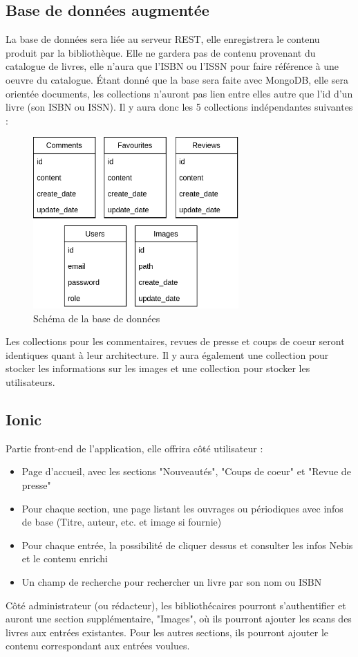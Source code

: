 \documentclass[a4paper, 12pt]{article}
\begin{document}
\subsection{Base de données augmentée}
La base de données sera liée au serveur REST, elle enregistrera le contenu produit par la bibliothèque. Elle ne gardera pas 
de contenu provenant du catalogue de livres, elle n'aura que l'ISBN ou l'ISSN pour faire référence à une oeuvre du catalogue. 
Étant donné que la base sera faite avec MongoDB, elle sera orientée documents, les collections n'auront pas lien entre elles 
autre que l'id d'un livre (son ISBN ou ISSN). Il y aura donc les 5 collections indépendantes suivantes :
\begin{figure}
    \begin{center}
        \includegraphics[width=0.7\textwidth]{images/bdd.png}
    \end{center}
    \caption{Schéma de la base de données}
\end{figure}
Les collections pour les commentaires, revues de presse et coups de coeur seront identiques quant à leur architecture. Il y 
aura également une collection pour stocker les informations sur les images et une collection pour stocker les utilisateurs.

\subsection{Ionic}
Partie front-end de l'application, elle offrira côté utilisateur :
\begin{itemize}
    \item Page d'accueil, avec les sections "Nouveautés", "Coups de coeur" et "Revue de presse"
    \item Pour chaque section, une page listant les ouvrages ou périodiques avec infos de base
        (Titre, auteur, etc. et image si fournie)
    \item Pour chaque entrée, la possibilité de cliquer dessus et consulter les infos Nebis et le contenu enrichi
    \item Un champ de recherche pour rechercher un livre par son nom ou ISBN
\end{itemize}
Côté administrateur (ou rédacteur), les bibliothécaires pourront s'authentifier et auront une section supplémentaire,
"Images", où ils pourront ajouter les scans des livres aux entrées existantes. Pour les autres sections, ils
pourront ajouter le contenu correspondant aux entrées voulues.
\end{document}
